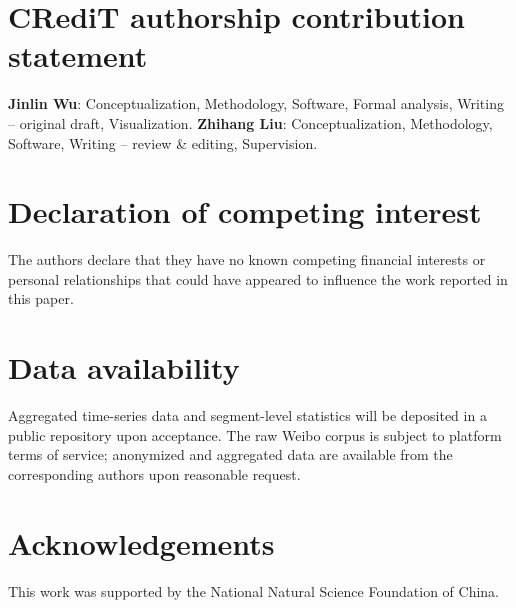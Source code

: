 \documentclass[preprint,12pt]{elsarticle}
\begin{document}
\FloatBarrier


\section*{CRediT authorship contribution statement}
\textbf{Jinlin Wu}: Conceptualization, Methodology, Software, Formal analysis, Writing -- original draft, Visualization.
\textbf{Zhihang Liu}: Conceptualization, Methodology, Software, Writing -- review \& editing, Supervision.

\section*{Declaration of competing interest}
The authors declare that they have no known competing financial interests or personal relationships that could have appeared to influence the work reported in this paper.

\section*{Data availability}
Aggregated time-series data and segment-level statistics will be deposited in a public repository upon acceptance. The raw Weibo corpus is subject to platform terms of service; anonymized and aggregated data are available from the corresponding authors upon reasonable request.

\section*{Acknowledgements}
This work was supported by the National Natural Science Foundation of China.



\end{document}
